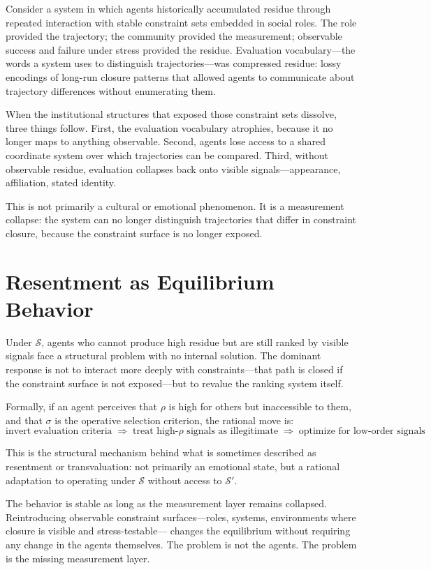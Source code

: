 \documentclass[12pt]{article}
\begin{document}
Consider a system in which agents historically accumulated residue
through repeated interaction with stable constraint sets embedded in
social roles. The role provided the trajectory; the community provided
the measurement; observable success and failure under stress provided
the residue. Evaluation vocabulary---the words a system uses to
distinguish trajectories---was compressed residue: lossy encodings of
long-run closure patterns that allowed agents to communicate about
trajectory differences without enumerating them.

When the institutional structures that exposed those constraint sets
dissolve, three things follow. First, the evaluation vocabulary
atrophies, because it no longer maps to anything observable. Second,
agents lose access to a shared coordinate system over which trajectories
can be compared. Third, without observable residue, evaluation collapses
back onto visible signals---appearance, affiliation, stated identity.

This is not primarily a cultural or emotional phenomenon. It is a
measurement collapse: the system can no longer distinguish trajectories
that differ in constraint closure, because the constraint surface is no
longer exposed.

\section{Resentment as Equilibrium Behavior}

Under $\mathcal{S}$, agents who cannot produce high residue but are
still ranked by visible signals face a structural problem with no
internal solution. The dominant response is not to interact more deeply
with constraints---that path is closed if the constraint surface is not
exposed---but to revalue the ranking system itself.

Formally, if an agent perceives that $\rho$ is high for others but
inaccessible to them, and that $\sigma$ is the operative selection
criterion, the rational move is:
\[
  \text{invert evaluation criteria}
  \;\Rightarrow\;
  \text{treat high-}\rho\text{ signals as illegitimate}
  \;\Rightarrow\;
  \text{optimize for low-order signals}
\]

This is the structural mechanism behind what is sometimes described as
resentment or transvaluation: not primarily an emotional state, but a
rational adaptation to operating under $\mathcal{S}$ without access to
$\mathcal{S}'$.

The behavior is stable as long as the measurement layer remains
collapsed. Reintroducing observable constraint surfaces---roles,
systems, environments where closure is visible and stress-testable---
changes the equilibrium without requiring any change in the agents
themselves. The problem is not the agents. The problem is the missing
measurement layer.
\end{document}
